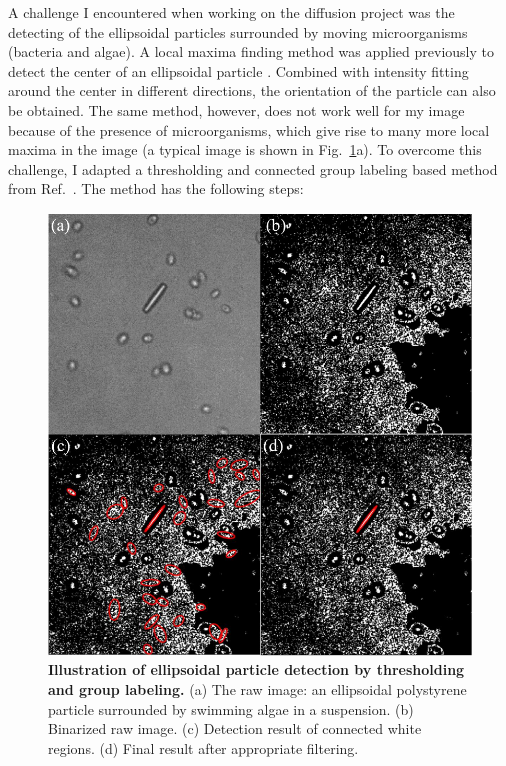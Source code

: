 A challenge I encountered when working on the diffusion project was the detecting of the ellipsoidal particles surrounded by moving microorganisms (bacteria and algae). A local maxima finding method was applied previously to detect the center of an ellipsoidal particle \cite{Han2006}. Combined with intensity fitting around the center in different directions, the orientation of the particle can also be obtained. The same method, however, does not work well for my image because of the presence of microorganisms, which give rise to many more local maxima in the image (a typical image is shown in Fig.~\ref{fig:2-5}a). To overcome this challenge, I adapted a thresholding and connected group labeling based method from Ref.~\cite{custom-feature-detection, Sauret2015, Cappello2015}. The method has the following steps:

\begin{figure}[!]
	\begin{center}
	\includegraphics[width=5.5 in]{Figs/2-Exp/5.pdf}
	\end{center}
	\caption[Illustration of Ellipsoidal Particle Detection by Thresholding and Group Labeling]
	{
	\textbf{Illustration of ellipsoidal particle detection by thresholding and group labeling.}
	(a) The raw image: an ellipsoidal polystyrene particle surrounded by swimming algae in a suspension.
	(b) Binarized raw image.
	(c) Detection result of connected white regions.
	(d) Final result after appropriate filtering.
	}
	\label{fig:2-5}
\end{figure}

